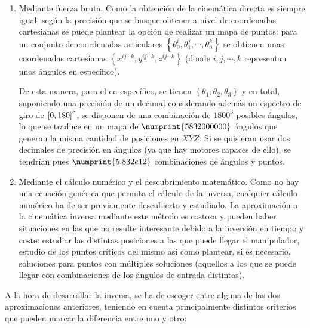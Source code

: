 \begin{enumerate}
    \item Mediante fuerza bruta. Como la obtención de la cinemática directa es siempre
    igual, según la precisión que se busque obtener a nivel de coordenadas cartesianas
    se puede plantear la opción de realizar un mapa de puntos: para un conjunto de
    coordenadas articulares $\left\{\theta_0^i,\theta_1^j,\cdots,\theta_n^k\right\}$ se
    obtienen unas coordenadas cartesianas 
    $\left\{x^{ij\cdots k}, y^{ij\cdots k}, z^{ij\cdots k}\right\}$ 
    (donde $i,j,\cdots,k$ representan unos ángulos en específico). 
    
    De esta manera, para el \pArm{} en específico, se tienen 
    $\left\{\theta_1, \theta_2, \theta_3\right\}$ y en total, suponiendo una precisión
    de un decimal considerando además un espectro de giro de $\left[0,180\right]\degree$,
    se disponen de una combinación de $1800^3$ posibles ángulos, lo que se traduce
    en un mapa de $\numprint{5832000000}$ ángulos que generan la misma cantidad de posiciones
    en $XYZ$. Si se quisieran usar dos decimales de precisión en ángulos (ya que hay motores capaces
    de ello), se tendrían pues $\numprint{5.832e12}$ combinaciones de ángulos y puntos.

    \item Mediante el cálculo numérico y el descubrimiento matemático. Como no hay una
    ecuación genérica que permita el cálculo de la inversa, cualquier cálculo numérico ha
    de ser previamente descubierto y estudiado. La aproximación a la cinemática inversa
    mediante este método es costosa y pueden haber situaciones en las que no resulte 
    interesante debido a la inversión en tiempo y coste: estudiar las distintas posiciones
    a las que puede llegar el manipulador, estudio de los puntos críticos del mismo
    así como plantear, si es necesario, soluciones para puntos con múltiples soluciones
    (aquellos a los que se puede llegar con combinaciones de los ángulos de entrada
    distintas).
\end{enumerate}

A la hora de desarrollar la inversa, se ha de escoger entre alguna de las dos aproximaciones
anteriores, teniendo en cuenta principalmente distintos criterios que pueden marcar la
diferencia entre uno y otro:


